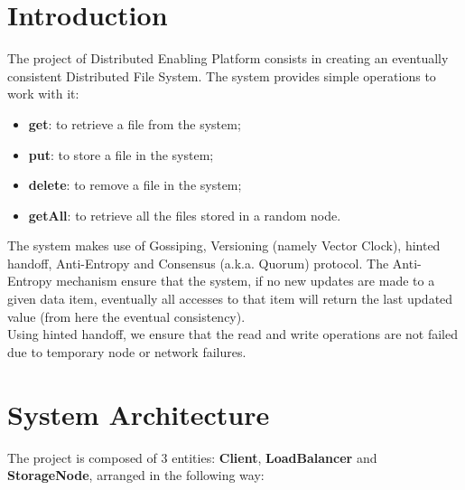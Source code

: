 \documentclass[12pt, a4paper, oneside] {book}
\begin{document}
\tableofcontents

\chapter{Introduction}

The project of Distributed Enabling Platform consists in creating an eventually consistent Distributed File System.
The system provides simple operations to work with it:

\begin{itemize}
  \item \textbf{get}: to retrieve a file from the system;
  \item \textbf{put}: to store a file in the system;
  \item \textbf{delete}: to remove a file in the system;
  \item \textbf{getAll}: to retrieve all the files stored in a random node.
\end{itemize}

The system makes use of Gossiping, Versioning (namely Vector Clock), hinted handoff, Anti-Entropy and Consensus (a.k.a. Quorum) protocol.
The Anti-Entropy mechanism ensure that the system, if no new updates are made to a given data item, eventually all accesses to that item will return the last updated value
(from here the eventual consistency).\\
Using hinted handoff, we ensure that the read and write operations are not failed due to temporary node or network failures.

\chapter{System Architecture}

The project is composed of 3 entities: \textbf{Client}, \textbf{LoadBalancer} and \textbf{StorageNode}, arranged in the following way:\\
\end{document}
